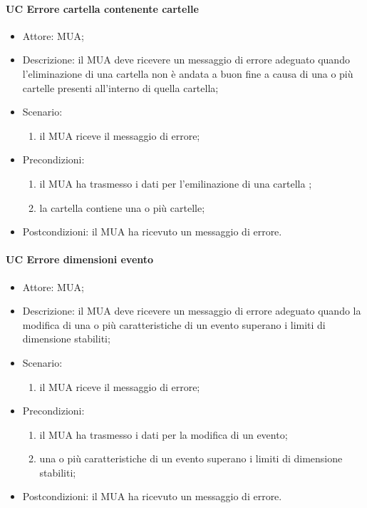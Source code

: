     \paragraph{UC Errore cartella contenente cartelle} \label{sec: UC 11.4.2.1}
    \begin{itemize}
        \item Attore: MUA;
        \item Descrizione: il MUA deve ricevere un messaggio di errore adeguato quando l'eliminazione di una cartella non è andata a buon fine a causa di una o più cartelle presenti all'interno di quella cartella;
        \item Scenario:
        \begin{enumerate}
        \item il MUA riceve il messaggio di errore;
        \end{enumerate}   
        \item Precondizioni: 
        \begin{enumerate}
            \item il MUA ha trasmesso i dati per l'emilinazione di una cartella ;
            \item la cartella contiene una o più cartelle;
        \end{enumerate}
        \item Postcondizioni: il MUA ha ricevuto un messaggio di errore.
    \end{itemize}

    \paragraph{UC Errore dimensioni evento} \label{sec: UC 11.4.2.1}
    \begin{itemize}
        \item Attore: MUA;
        \item Descrizione: il MUA deve ricevere un messaggio di errore adeguato quando la modifica di una o più caratteristiche di un evento superano i limiti di dimensione stabiliti;
        \item Scenario:
        \begin{enumerate}
        \item il MUA riceve il messaggio di errore;
        \end{enumerate}   
        \item Precondizioni: 
        \begin{enumerate}
            \item il MUA ha trasmesso i dati per la modifica di un evento;
            \item una o più caratteristiche di un evento superano i limiti di dimensione stabiliti;
        \end{enumerate}
        \item Postcondizioni: il MUA ha ricevuto un messaggio di errore.
    \end{itemize}

